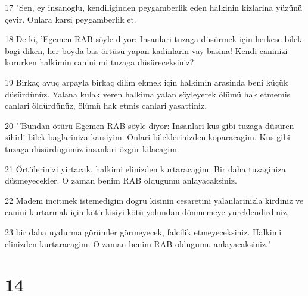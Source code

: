\par 17 "Sen, ey insanoglu, kendiliginden peygamberlik eden halkinin kizlarina yüzünü çevir. Onlara karsi peygamberlik et.
\par 18 De ki, 'Egemen RAB söyle diyor: Insanlari tuzaga düsürmek için herkese bilek bagi diken, her boyda bas örtüsü yapan kadinlarin vay basina! Kendi caninizi korurken halkimin canini mi tuzaga düsüreceksiniz?
\par 19 Birkaç avuç arpayla birkaç dilim ekmek için halkimin arasinda beni küçük düsürdünüz. Yalana kulak veren halkima yalan söyleyerek ölümü hak etmemis canlari öldürdünüz, ölümü hak etmis canlari yasattiniz.
\par 20 "'Bundan ötürü Egemen RAB söyle diyor: Insanlari kus gibi tuzaga düsüren sihirli bilek baglariniza karsiyim. Onlari bileklerinizden koparacagim. Kus gibi tuzaga düsürdügünüz insanlari özgür kilacagim.
\par 21 Örtülerinizi yirtacak, halkimi elinizden kurtaracagim. Bir daha tuzaginiza düsmeyecekler. O zaman benim RAB oldugumu anlayacaksiniz.
\par 22 Madem incitmek istemedigim dogru kisinin cesaretini yalanlarinizla kirdiniz ve canini kurtarmak için kötü kisiyi kötü yolundan dönmemeye yüreklendirdiniz,
\par 23 bir daha uydurma görümler görmeyecek, falcilik etmeyeceksiniz. Halkimi elinizden kurtaracagim. O zaman benim RAB oldugumu anlayacaksiniz."

\chapter{14}

